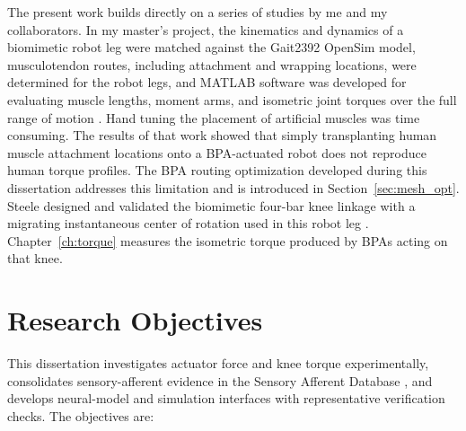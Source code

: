 The present work builds directly on a series of studies by me and my collaborators. In my master's project, the kinematics and dynamics of a biomimetic robot leg were matched against the Gait2392 OpenSim model, musculotendon routes, including attachment and wrapping locations, were determined for the robot legs, and MATLAB software was developed for evaluating muscle lengths, moment arms, and isometric joint torques over the full range of motion \citep{bolen_bipedal_2019, bolen_determination_2019}. Hand tuning the placement of artificial muscles was time consuming. The results of that work showed that simply transplanting human muscle attachment locations onto a BPA-actuated robot does not reproduce human torque profiles. The BPA routing optimization developed during this dissertation addresses this limitation and is introduced in Section~\ref{sec:mesh_opt}. Steele designed and validated the biomimetic four-bar knee linkage with a migrating instantaneous center of rotation used in this robot leg \citep{steele_development_2017, steele_biomimetic_2018, steele_biomimetic_2018-1}. Chapter~\ref{ch:torque} measures the isometric torque produced by BPAs acting on that knee.

\section{Research Objectives}\label{sec:objectives}

This dissertation investigates actuator force and knee torque experimentally, consolidates sensory-afferent evidence in the Sensory Afferent Database \citep{bolen_sensory_2023, bolen_using_2024}, and develops neural-model and simulation interfaces with representative verification checks. The objectives are:

